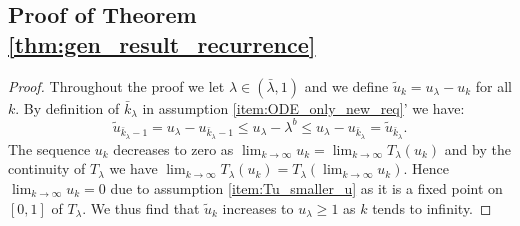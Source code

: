 \documentclass[12pt]{report}
\begin{document}
\subsection{Proof of Theorem \ref{thm:gen_result_recurrence}} \label{sec:proof_rec}
\begin{proof}
	
	Throughout the proof we let $\lambda \in (\bar \lambda, 1)$ and we define $\tilde u_k = u_\lambda - u_k$ for all $k$. By definition of $\bar k_\lambda$ in assumption \ref{item:ODE_only_new_req}' we have:
	$$
	\tilde u_{\bar k_\lambda - 1} = u_{\lambda} - u_{\bar k_\lambda - 1} \leq u_\lambda - \lambda^b \leq u_{\lambda} - u_{\bar k_\lambda} = \tilde u_{\bar k_\lambda}.
	$$
	The sequence $u_k$ decreases to zero as $\lim_{k \rightarrow \infty} u_k = 
	\lim_{k \rightarrow \infty} T_\lambda(u_k)$ and by the continuity of $T_\lambda$ we have
	$\lim_{k \rightarrow \infty} T_\lambda(u_k) = T_\lambda(\lim_{k \rightarrow \infty} u_k)$.
	Hence $\lim_{k \rightarrow \infty} u_k = 0$ due to assumption \ref{item:Tu_smaller_u} 
	as it is a fixed point on $[0,1]$ of $T_\lambda$.
	We thus find that $\tilde u_k$ increases to $u_\lambda \geq 1$ as $k$ tends to infinity.
	

\end{proof}
\end{document}
